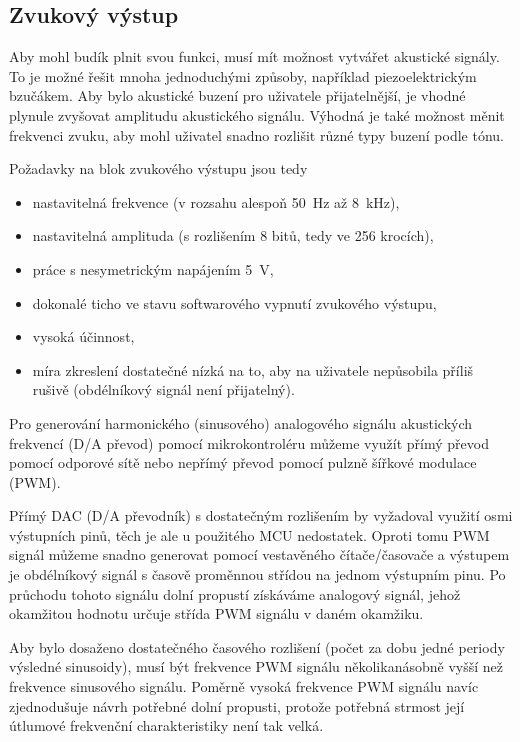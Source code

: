 \subsection{Zvukový výstup}
Aby mohl budík plnit svou funkci, musí mít možnost vytvářet akustické signály.
To je možné řešit mnoha jednoduchými způsoby, například piezoelektrickým
bzučákem. Aby bylo akustické buzení pro uživatele přijatelnější, je vhodné
plynule zvyšovat amplitudu akustického signálu. Výhodná je také možnost měnit
frekvenci zvuku, aby mohl uživatel snadno rozlišit různé typy buzení podle
tónu.

Požadavky na blok zvukového výstupu jsou tedy
\begin{itemize}[nosep]
    \item nastavitelná frekvence (v rozsahu alespoň \SI{50}{\hertz} až
        \SI{8}{\kilo\hertz}),
    \item nastavitelná amplituda (s rozlišením 8 bitů, tedy ve 256 krocích),
    \item práce s nesymetrickým napájením \SI{5}{\volt},
    \item dokonalé ticho ve stavu softwarového vypnutí zvukového výstupu,
    \item vysoká účinnost,
    \item míra zkreslení dostatečné nízká na to, aby na uživatele nepůsobila
        příliš rušivě (obdélníkový signál není přijatelný).
\end{itemize}

Pro generování harmonického (sinusového) analogového signálu akustických
frekvencí (D/A převod) pomocí mikrokontroléru můžeme využít přímý převod pomocí
odporové sítě nebo nepřímý převod pomocí pulzně šířkové modulace (PWM).

Přímý DAC (D/A převodník) s dostatečným rozlišením by vyžadoval využití osmi
výstupních pinů, těch je ale u použitého MCU nedostatek. Oproti tomu PWM signál
můžeme snadno generovat pomocí vestavěného čítače/časovače a výstupem je
obdélníkový signál s časově proměnnou střídou na jednom výstupním pinu. Po
průchodu tohoto signálu dolní propustí získáváme analogový signál, jehož
okamžitou hodnotu určuje střída PWM signálu v daném okamžiku.

Aby bylo dosaženo dostatečného časového rozlišení (počet  za dobu
jedné periody výsledné sinusoidy), musí být frekvence PWM signálu
několikanásobně vyšší než frekvence sinusového signálu. Poměrně vysoká
frekvence PWM signálu navíc zjednodušuje návrh potřebné dolní propusti, protože
potřebná strmost její útlumové frekvenční charakteristiky není tak velká.

